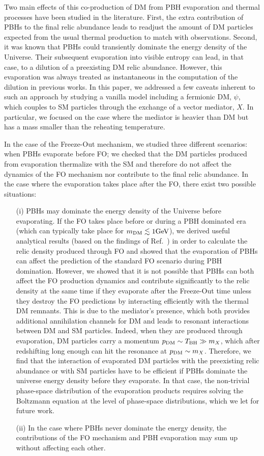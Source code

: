 \documentclass[aps,prd,reprint,twocolumn,preprintnumbers,floatfix,nofootinbib]{revtex4-1}
\newcommand{\mDM}{m_{\rm DM}}
\begin{document}
Two main effects of this co-production of DM from PBH evaporation and thermal processes have been studied in the literature. First, the extra contribution of PBHs to the final relic abundance leads to readjust the amount of DM particles expected from the usual thermal production to match with observations. Second, it was known that PBHs could transiently dominate the energy density of the Universe. Their subsequent evaporation into visible entropy can lead, in that case, to a dilution of a preexisting DM relic abundance. However, this evaporation was always treated as instantaneous in the computation of the dilution in previous works. In this paper, we addressed a few caveats inherent to such an approach by studying a vanilla model including a fermionic DM, $\psi$, which couples to SM particles through the exchange of a vector mediator, $X$. In particular, we focused on the case where the mediator is heavier than DM but has a mass smaller than the reheating temperature. 

In the case of the Freeze-Out mechanism, we studied three different scenarios:
when PBHs evaporate before FO; we checked that the DM particles produced from evaporation thermalize with the SM and therefore do not affect the dynamics of the FO mechanism nor contribute to the final relic abundance. In the case where the evaporation takes place after the FO, there exist two possible situations: 
\begin{itemize}
    \item[(i)]  PBHs may dominate the energy density of the Universe before evaporating. If the FO takes place before or during a PBH dominated era (which can typically take place for $\mDM\lesssim 1\mathrm{GeV}$), we derived useful analytical results (based on the findings of Ref.~\cite{Arias:2019uol}) in order to calculate the relic density produced through FO and showed that the evaporation of PBHs can affect the prediction of the standard FO scenario during PBH domination. However, we showed that it is not possible that PBHs can both affect the FO production dynamics and contribute significantly to the relic density at the same time if they evaporate after the Freeze-Out time unless they destroy the FO predictions by interacting efficiently with the thermal DM remnants. This is due to the mediator's presence, which both provides additional annihilation channels for DM and leads to resonant interactions between DM and SM particles. Indeed, when they are produced through evaporation, DM particles carry a momentum $p_{\rm DM}\sim T_{\rm BH}\gg m_X$, which after redshifting long enough can hit the resonance at $p_{\rm DM}\sim m_X$. Therefore, we find that the interaction of evaporated DM particles with the preexisting relic abundance or with SM particles have to be efficient if PBHs dominate the universe energy density before they evaporate. In that case, the non-trivial phase-space distribution of the evaporation products requires solving the Boltzmann equation at the level of phase-space distributions, which we let for future work.
\item[(ii)] In the case where PBHs never dominate the energy density, the contributions of the FO mechanism and PBH evaporation may sum up without affecting each other. 
 \end{itemize}
\end{document}

